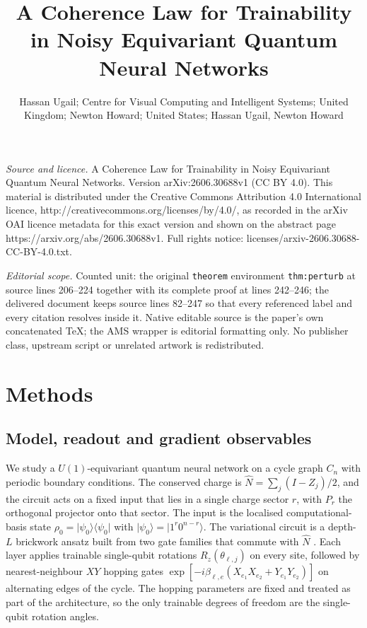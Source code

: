 \documentclass[10pt,a4paper]{amsart}
\providecommand{\ket}[1]{\lvert #1\rangle}
\providecommand{\bra}[1]{\langle #1\rvert}
\begin{document}
\title[A Coherence Law for Trainability in Noisy Equivariant Quantu]{A Coherence Law for Trainability in Noisy Equivariant Quantum Neural Networks}
\author{Hassan Ugail; Centre for Visual Computing and Intelligent Systems; United Kingdom; Newton Howard; United States; Hassan Ugail, Newton Howard}
\date{}
\maketitle
\noindent\emph{Source and licence.} A Coherence Law for Trainability in Noisy Equivariant Quantum Neural Networks. Version arXiv:2606.30688v1 (CC BY 4.0). This material is distributed under the Creative Commons Attribution 4.0 International licence, http://creativecommons.org/licenses/by/4.0/, as recorded in the arXiv OAI licence metadata for this exact version and shown on the abstract page https://arxiv.org/abs/2606.30688v1. Full rights notice: licenses/arxiv-2606.30688-CC-BY-4.0.txt.\par\smallskip
\noindent\textit{Editorial scope.} Counted unit: the original \texttt{theorem} environment \texttt{thm:perturb} at source lines 206--224 together with its complete proof at lines 242--246; the delivered document keeps source lines 82--247 so that every referenced label and every citation resolves inside it. Native editable source is the paper's own concatenated TeX; the AMS wrapper is editorial formatting only. No publisher class, upstream script or unrelated artwork is redistributed.
\section{Methods}\label{sec:methods}

\subsection{Model, readout and gradient observables}\label{sec:model}

We study a $U(1)$-equivariant quantum neural network on a cycle graph $C_n$ with periodic boundary conditions. The conserved charge is $\hat N=\sum_j(I-Z_j)/2$, and the circuit acts on a fixed input that lies in a single charge sector $r$, with $P_r$ the orthogonal projector onto that sector. The input is the localised computational-basis state $\rho_0=\ket{\psi_0}\bra{\psi_0}$ with $\ket{\psi_0}=\ket{1^r 0^{n-r}}$. The variational circuit is a depth-$L$ brickwork ansatz built from two gate families that commute with $\hat N$ \cite{nguyen2024,schatzki2024,larocca2022groupinv}. Each layer applies trainable single-qubit rotations $R_z(\theta_{\ell,j})$ on every site, followed by nearest-neighbour $XY$ hopping gates $\exp[-i\beta_{\ell,e}(X_{e_1}X_{e_2}+Y_{e_1}Y_{e_2})]$ on alternating edges of the cycle. The hopping parameters are fixed and treated as part of the architecture, so the only trainable degrees of freedom are the single-qubit rotation angles.
\end{document}
